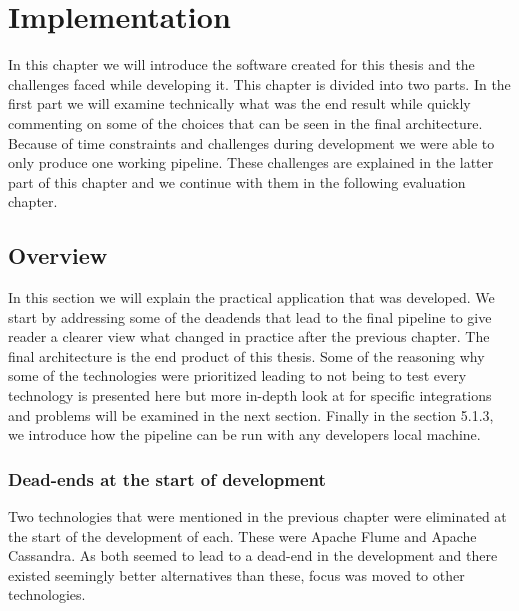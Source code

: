 \chapter{Implementation}
\label{chapter:implementation}



In this chapter we will introduce the software created for this thesis and the challenges faced while developing it.
This chapter is divided into two parts.
In the first part we will examine technically what was the end result while quickly commenting on some of the choices that can be seen in the final architecture.
Because of time constraints and challenges during development we were able to only produce one working pipeline.
These challenges are explained in the latter part of this chapter and we continue with them in the following evaluation chapter.

\section{Overview}

In this section we will explain the practical application that was developed.
We start by addressing some of the deadends that lead to the final pipeline to give reader a clearer view what changed in practice after the previous chapter.
The final architecture is the end product of this thesis.
Some of the reasoning why some of the technologies were prioritized leading to not being to test every technology is presented here but more in-depth look at for specific integrations and problems will be examined in the next section.
Finally in the section 5.1.3, we introduce how the pipeline can be run with any developers local machine.


\subsection{Dead-ends at the start of development}

Two technologies that were mentioned in the previous chapter were eliminated at the start of the development of each.
These were Apache Flume and Apache Cassandra.
As both seemed to lead to a dead-end in the development and there existed seemingly better alternatives than these, focus was moved to other technologies.

